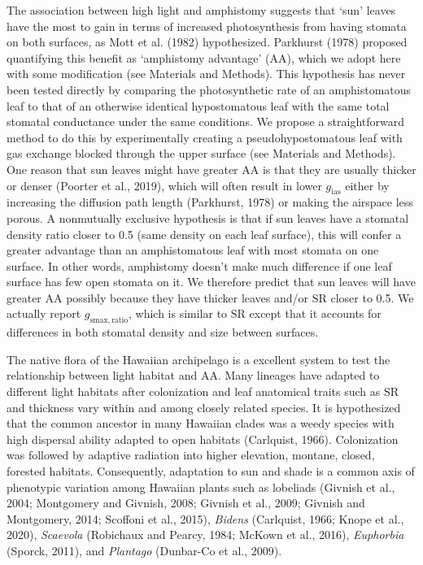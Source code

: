 \documentclass[
  letterpaper,
  DIV=11,
  numbers=noendperiod]{scrartcl}
\begin{document}
The association between high light and amphistomy suggests that `sun'
leaves have the most to gain in terms of increased photosynthesis from
having stomata on both surfaces, as Mott et al. (1982) hypothesized.
Parkhurst (1978) proposed quantifying this benefit as `amphistomy
advantage' (\(\mathrm{AA}\)), which we adopt here with some modification
(see Materials and Methods). This hypothesis has never been tested
directly by comparing the photosynthetic rate of an amphistomatous leaf
to that of an otherwise identical hypostomatous leaf with the same total
stomatal conductance under the same conditions. We propose a
straightforward method to do this by experimentally creating a
pseudohypostomatous leaf with gas exchange blocked through the upper
surface (see Materials and Methods). One reason that sun leaves might
have greater \(\mathrm{AA}\) is that they are usually thicker or denser
(Poorter et al., 2019), which will often result in lower
\(g_\mathrm{ias}\) either by increasing the diffusion path length
(Parkhurst, 1978) or making the airspace less porous. A nonmutually
exclusive hypothesis is that if sun leaves have a stomatal density ratio
closer to 0.5 (same density on each leaf surface), this will confer a
greater advantage than an amphistomatous leaf with most stomata on one
surface. In other words, amphistomy doesn't make much difference if one
leaf surface has few open stomata on it. We therefore predict that sun
leaves will have greater \(\mathrm{AA}\) possibly because they have
thicker leaves and/or \(\mathrm{SR}\) closer to 0.5. We actually report
\(g_{\mathrm{smax,ratio}}\), which is similar to \(\mathrm{SR}\) except
that it accounts for differences in both stomatal density and size
between surfaces.

The native flora of the Hawaiian archipelago is a excellent system to
test the relationship between light habitat and \(\mathrm{AA}\). Many
lineages have adapted to different light habitats after colonization and
leaf anatomical traits such as \(\mathrm{SR}\) and thickness vary within
and among closely related species. It is hypothesized that the common
ancestor in many Hawaiian clades was a weedy species with high dispersal
ability adapted to open habitats (Carlquist, 1966). Colonization was
followed by adaptive radiation into higher elevation, montane, closed,
forested habitats. Consequently, adaptation to sun and shade is a common
axis of phenotypic variation among Hawaiian plants such as lobeliads
(Givnish et al., 2004; Montgomery and Givnish, 2008; Givnish et al.,
2009; Givnish and Montgomery, 2014; Scoffoni et al., 2015),
\emph{Bidens} (Carlquist, 1966; Knope et al., 2020), \emph{Scaevola}
(Robichaux and Pearcy, 1984; McKown et al., 2016), \emph{Euphorbia}
(Sporck, 2011), and \emph{Plantago} (Dunbar-Co et al., 2009).
\end{document}
